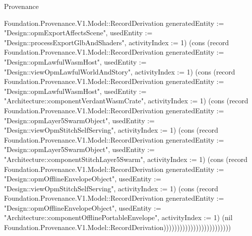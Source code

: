 \begin{lexlean}{Provenance}
\begin{semanticmodule}
{Foundation.Provenance.V1.Model::RecordDerivation {generatedEntity := "Design::opmExportAffectsScene", usedEntity := "Design::processExportGlbAndShaders", activityIndex := 1}) (cons (record Foundation.Provenance.V1.Model::RecordDerivation {generatedEntity := "Design::opmLawfulWasmHost", usedEntity := "Design::viewOpmLawfulWorldAndStory", activityIndex := 1}) (cons (record Foundation.Provenance.V1.Model::RecordDerivation {generatedEntity := "Design::opmLawfulWasmHost", usedEntity := "Architecture::componentVerdantWasmCrate", activityIndex := 1}) (cons (record Foundation.Provenance.V1.Model::RecordDerivation {generatedEntity := "Design::opmLayer5SwarmObject", usedEntity := "Design::viewOpmStitchSelfServing", activityIndex := 1}) (cons (record Foundation.Provenance.V1.Model::RecordDerivation {generatedEntity := "Design::opmLayer5SwarmObject", usedEntity := "Architecture::componentStitchLayer5Swarm", activityIndex := 1}) (cons (record Foundation.Provenance.V1.Model::RecordDerivation {generatedEntity := "Design::opmOfflineEnvelopeObject", usedEntity := "Design::viewOpmStitchSelfServing", activityIndex := 1}) (cons (record Foundation.Provenance.V1.Model::RecordDerivation {generatedEntity := "Design::opmOfflineEnvelopeObject", usedEntity := "Architecture::componentOfflinePortableEnvelope", activityIndex := 1}) (nil Foundation.Provenance.V1.Model::RecordDerivation)))))))))))))))))))))))))
}


\end{semanticmodule}
\end{lexlean}
